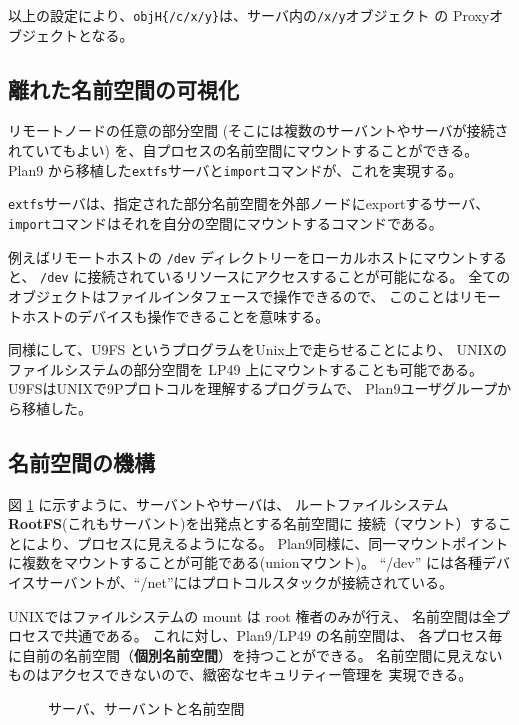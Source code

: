 \documentclass{ipsjpapers}
\begin{document}
\begin{enumerate}
    以上の設定により、{\tt objH\{/c/x/y\}}は、サーバ内の{\tt /x/y}オブジェクト
    の Proxyオブジェクトとなる。

\end{enumerate}



\subsection{離れた名前空間の可視化}

リモートノードの任意の部分空間
(そこには複数のサーバントやサーバが接続されていてもよい)
を、自プロセスの名前空間にマウントすることができる。
Plan9 から移植した{\tt extfs}サーバと{\tt import}コマンドが、これを実現する。

{\tt extfs}サーバは、指定された部分名前空間を外部ノードにexportするサーバ、
{\tt import}コマンドはそれを自分の空間にマウントするコマンドである。

例えばリモートホストの {\tt /dev} ディレクトリーをローカルホストにマウントすると、
{\tt /dev} に接続されているリソースにアクセスすることが可能になる。
全てのオブジェクトはファイルインタフェースで操作できるので、
このことはリモートホストのデバイスも操作できることを意味する。

同様にして、U9FS というプログラムをUnix上で走らせることにより、
UNIXのファイルシステムの部分空間を LP49 上にマウントすることも可能である。
U9FSはUNIXで9Pプロトコルを理解するプログラムで、
Plan9ユーザグループから移植した。



\subsection{名前空間の機構}

図 \ref{fig:NS-server-servant} に示すように、サーバントやサーバは、
ルートファイルシステム{\bf RootFS}(これもサーバント)を出発点とする名前空間に
接続（マウント）することにより、プロセスに見えるようになる。
Plan9同様に、同一マウントポイントに複数をマウントすることが可能である(unionマウント)。
``/dev'' には各種デバイスサーバントが、``/net''にはプロトコルスタックが接続されている。

  UNIXではファイルシステムの mount は root 権者のみが行え、
  名前空間は全プロセスで共通である。
  これに対し、Plan9/LP49 の名前空間は、
  各プロセス毎に自前の名前空間（{\bf 個別名前空間}）を持つことができる。
  名前空間に見えないものはアクセスできないので、緻密なセキュリティー管理を
  実現できる。

\begin{figure}[htb]
  \begin{center}
   \epsfxsize=340pt
    \caption{サーバ、サーバントと名前空間}
    \label{fig:NS-server-servant}
  \end{center}
\end{figure}
\end{document}
